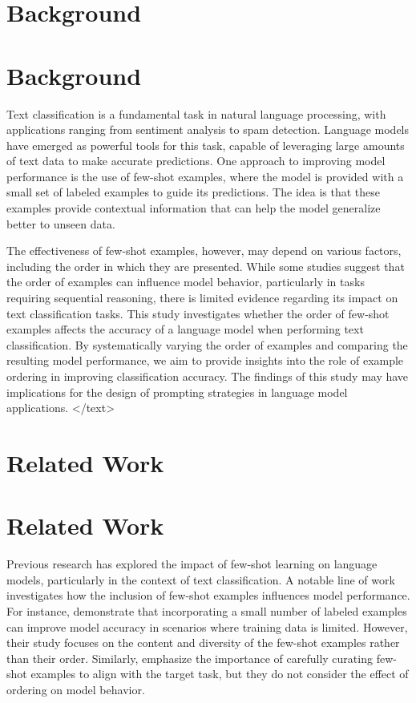 \documentclass{article}
\begin{document}
\section{Background}
\section{Background}

Text classification is a fundamental task in natural language processing, with applications ranging from sentiment analysis to spam detection. Language models have emerged as powerful tools for this task, capable of leveraging large amounts of text data to make accurate predictions. One approach to improving model performance is the use of few-shot examples, where the model is provided with a small set of labeled examples to guide its predictions. The idea is that these examples provide contextual information that can help the model generalize better to unseen data.

The effectiveness of few-shot examples, however, may depend on various factors, including the order in which they are presented. While some studies suggest that the order of examples can influence model behavior, particularly in tasks requiring sequential reasoning, there is limited evidence regarding its impact on text classification tasks. This study investigates whether the order of few-shot examples affects the accuracy of a language model when performing text classification. By systematically varying the order of examples and comparing the resulting model performance, we aim to provide insights into the role of example ordering in improving classification accuracy. The findings of this study may have implications for the design of prompting strategies in language model applications.
</text>
\section{Related Work}
\section*{Related Work}

Previous research has explored the impact of few-shot learning on language models, particularly in the context of text classification. A notable line of work investigates how the inclusion of few-shot examples influences model performance. For instance, \citet{li2023few} demonstrate that incorporating a small number of labeled examples can improve model accuracy in scenarios where training data is limited. However, their study focuses on the content and diversity of the few-shot examples rather than their order. Similarly, \citet{zhang2022prompt} emphasize the importance of carefully curating few-shot examples to align with the target task, but they do not consider the effect of ordering on model behavior.
\end{document}

